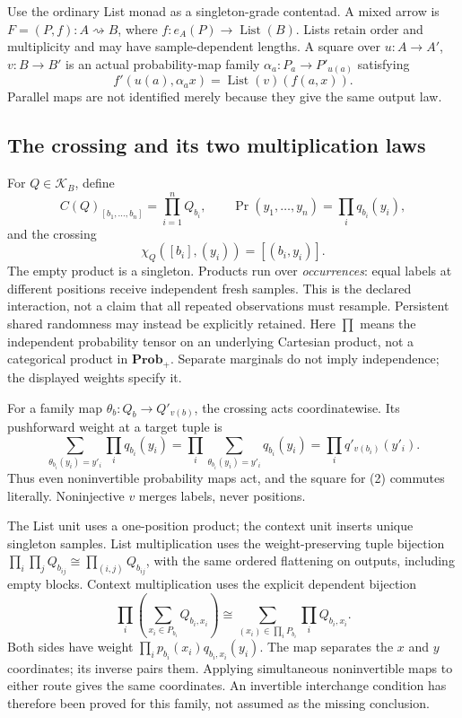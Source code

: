 \documentclass[11pt,a4paper]{article}
\newcommand{\List}{\operatorname{List}}
\newcommand{\Prob}{\mathbf{Prob}_{+}}
\begin{document}
Use the ordinary List monad as a singleton-grade contentad. A mixed arrow is
\(F=(P,f):A\rightsquigarrow B\), where
\(f:e_A(P)\to\List(B)\). Lists retain order and multiplicity and may
have sample-dependent lengths. A square over \(u:A\to A'\),
\(v:B\to B'\) is an actual probability-map family
\(\alpha_a:P_a\to P'_{u(a)}\) satisfying
\[
 f'(u(a),\alpha_a x)=\List(v)(f(a,x)).                 \tag{1}
\]
Parallel maps are not identified merely because they give the same output law.

\subsection{The crossing and its two multiplication laws}

For \(Q\in\mathcal K_B\), define
\[
 C(Q)_{[b_1,\ldots,b_n]}=\prod_{i=1}^n Q_{b_i},
 \qquad \Pr(y_1,\ldots,y_n)=\prod_iq_{b_i}(y_i),
\]
and the crossing
\[
 \chi_Q([b_i],(y_i))=[(b_i,y_i)].                    \tag{2}
\]
The empty product is a singleton. Products run over \emph{occurrences}:
equal labels at different positions receive independent fresh samples. This
is the declared interaction, not a claim that all repeated observations must
resample. Persistent shared randomness may instead be explicitly retained.
Here \(\prod\) means the independent probability tensor on an underlying
Cartesian product, not a categorical product in \(\Prob\). Separate marginals
do not imply independence; the displayed weights specify it.

For a family map \(\theta_b:Q_b\to Q'_{v(b)}\), the crossing acts
coordinatewise. Its pushforward weight at a target tuple is
\[
 \sum_{\theta_{b_i}(y_i)=y'_i}\prod_iq_{b_i}(y_i)
 =\prod_i\sum_{\theta_{b_i}(y_i)=y'_i}q_{b_i}(y_i)
 =\prod_iq'_{v(b_i)}(y'_i).                         \tag{3}
\]
Thus even noninvertible probability maps act, and the square for (2) commutes
literally. Noninjective \(v\) merges labels, never positions.

The List unit uses a one-position product; the context unit inserts unique
singleton samples. List multiplication uses the weight-preserving tuple
bijection \(\prod_i\prod_jQ_{b_{ij}}\cong\prod_{(i,j)}Q_{b_{ij}}\),
with the same ordered flattening on outputs, including empty blocks.
Context multiplication uses the explicit dependent bijection
\[
 \prod_i\left(\sum_{x_i\in P_{b_i}}Q_{b_i,x_i}\right)
 \cong
 \sum_{(x_i)\in\prod_iP_{b_i}}\prod_iQ_{b_i,x_i}.    \tag{4}
\]
Both sides have weight \(\prod_ip_{b_i}(x_i)q_{b_i,x_i}(y_i)\).
The map separates the \(x\) and \(y\) coordinates; its inverse pairs them.
Applying simultaneous noninvertible maps to either route gives the same
coordinates. An invertible interchange condition has therefore been proved
for this family, not assumed as the missing conclusion.
\end{document}
